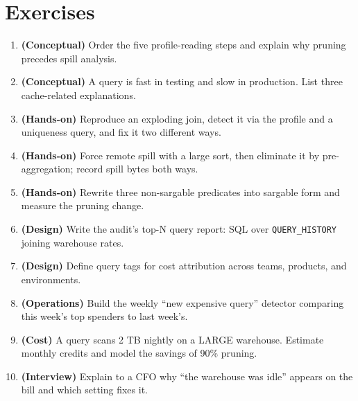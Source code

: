 \section{Exercises}
\begin{enumerate}
    \item \textbf{(Conceptual)} Order the five profile-reading steps and explain why pruning precedes spill analysis.
    \item \textbf{(Conceptual)} A query is fast in testing and slow in production. List three cache-related explanations.
    \item \textbf{(Hands-on)} Reproduce an exploding join, detect it via the profile and a uniqueness query, and fix it two different ways.
    \item \textbf{(Hands-on)} Force remote spill with a large sort, then eliminate it by pre-aggregation; record spill bytes both ways.
    \item \textbf{(Hands-on)} Rewrite three non-sargable predicates into sargable form and measure the pruning change.
    \item \textbf{(Design)} Write the audit's top-N query report: SQL over \texttt{QUERY\_HISTORY} joining warehouse rates.
    \item \textbf{(Design)} Define query tags for cost attribution across teams, products, and environments.
    \item \textbf{(Operations)} Build the weekly ``new expensive query'' detector comparing this week's top spenders to last week's.
    \item \textbf{(Cost)} A query scans 2 TB nightly on a LARGE warehouse. Estimate monthly credits and model the savings of 90\% pruning.
    \item \textbf{(Interview)} Explain to a CFO why ``the warehouse was idle'' appears on the bill and which setting fixes it.
\end{enumerate}
